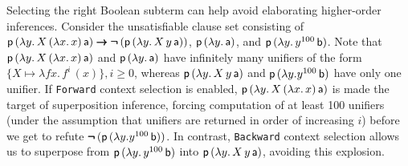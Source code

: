 \documentclass[smallcondensed,draft]{svjour3}     %
\begin{document}
\begin{exa}
  Selecting the right Boolean subterm can help avoid elaborating
  high\-er-order inferences. Consider the unsatisfiable clause set consisting of ${\mathsf{p}} \, (\lambda y.\, X
  \, (\lambda x.\, x) \, {\mathsf{a}}) \pmb\rightarrow\allowbreak \pmb{\neg\,}({\mathsf{p}} \, (\lambda y. \allowbreak\, X
  \, y \, {\mathsf{a}}))$, ${\mathsf{p}} \, (\lambda y.\, {\mathsf{a}})$, and
  ${\mathsf{p}} \, (\lambda y. \, y^{100} \, {\mathsf{b}})$.
  Note that ${\mathsf{p}} \, (\lambda y.\, X
  \, (\lambda x.\, x) \, {\mathsf{a}})$ and ${\mathsf{p}} \,
  (\lambda y.\, {\mathsf{a}})$ have infinitely many unifiers of the form $\{ X \mapsto \lambda fx.
  \, f^i\, (x) \}, i \geq 0$, whereas ${\mathsf{p}} \, (\lambda y. \, X
  \, y \, {\mathsf{a}})$ and ${\mathsf{p}} \, (\lambda y. y^{100} \, {\mathsf{b}})$ have only one unifier. 
  If \texttt{Forward} context selection is enabled,
  ${\mathsf{p}} \, (\lambda y.\, X \, (\lambda x.\, x) \, {\mathsf{a}})$ is made the target of superposition inference, 
  forcing computation of at least 100 unifiers (under the assumption that
  unifiers are returned in order of increasing $i$) before we get to refute
  $\pmb{\neg\,}({\mathsf{p}} \, (\lambda y. y^{100} \, {\mathsf{b}}))$.
  In contrast, \texttt{Backward} context selection allows us to
  superpose from ${\mathsf{p}} \, (\lambda y. \, y^{100} \, {\mathsf{b}})$ into ${\mathsf{p}} \, (\lambda y. \, X
  \, y \, {\mathsf{a}})$, avoiding this explosion. 
\end{exa}

\end{document}
